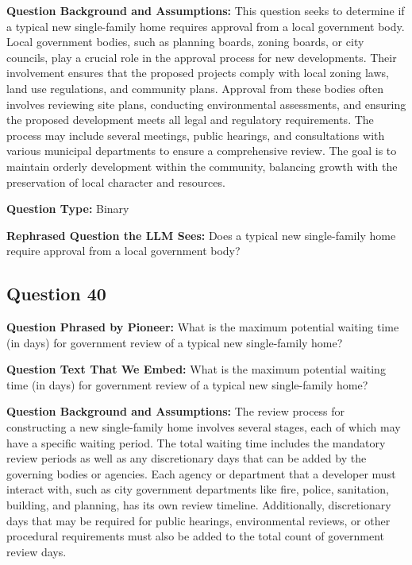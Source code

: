 \noindent\textbf{Question Background and Assumptions:} This question seeks to determine if a typical new single-family home requires approval from a local government body. Local government bodies, such as planning boards, zoning boards, or city councils, play a crucial role in the approval process for new developments. Their involvement ensures that the proposed projects comply with local zoning laws, land use regulations, and community plans. Approval from these bodies often involves reviewing site plans, conducting environmental assessments, and ensuring the proposed development meets all legal and regulatory requirements. The process may include several meetings, public hearings, and consultations with various municipal departments to ensure a comprehensive review. The goal is to maintain orderly development within the community, balancing growth with the preservation of local character and resources.

\noindent\textbf{Question Type:} Binary

\noindent\textbf{Rephrased Question the LLM Sees:} Does a typical new single-family home require approval from a local government body?

\vspace{1cm}
\subsection*{Question 40}
\noindent\textbf{Question Phrased by Pioneer:} What is the maximum potential waiting time (in days) for government review of a typical new single-family home?

\noindent\textbf{Question Text That We Embed:} What is the maximum potential waiting time (in days) for government review of a typical new single-family home?

\noindent\textbf{Question Background and Assumptions:} The review process for constructing a new single-family home involves several stages, each of which may have a specific waiting period. The total waiting time includes the mandatory review periods as well as any discretionary days that can be added by the governing bodies or agencies. Each agency or department that a developer must interact with, such as city government departments like fire, police, sanitation, building, and planning, has its own review timeline. Additionally, discretionary days that may be required for public hearings, environmental reviews, or other procedural requirements must also be added to the total count of government review days.

